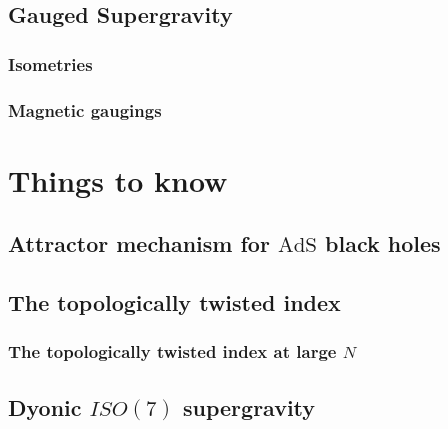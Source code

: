 \documentclass[a4paper, 10pt, superscriptaddress, nofootinbib, showkeys, notitlepage]{revtex4-1}
\begin{document}
	
\subsection{Gauged Supergravity}

	
\subsubsection*{Isometries}


\subsubsection*{Magnetic gaugings}
	
\section{Things to know}
	

\subsection{\texorpdfstring{Attractor mechanism for $\mathrm{AdS}$ black holes}{Attractor mechanism for AdS black holes}}
	
	
\subsection{The topologically twisted index}
	
\subsubsection*{\texorpdfstring{The topologically twisted index at large $N$}{The topologically twisted index at large N}}

\subsection{\texorpdfstring{Dyonic $ISO(7)$ supergravity}{Dyonic ISO(7) supergravity}}
	
	\appendix
\end{document}
